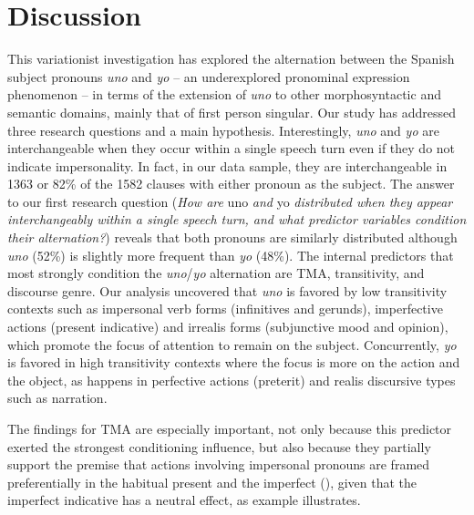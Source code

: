 \documentclass[output=paper]{langscibook}
\begin{document}
\section{Discussion}\label{sec:orozco:5}


This variationist investigation has explored the alternation between the Spanish subject pronouns \textit{uno} and \textit{yo} – an underexplored pronominal expression phenomenon – in terms of the extension of \textit{uno} to other morphosyntactic and semantic domains, mainly that of first person singular. Our study has addressed three research questions and a main hypothesis. Interestingly, \textit{uno} and \textit{yo} are interchangeable when they occur within a single speech turn even if they do not indicate impersonality. In fact, in our data sample, they are interchangeable in 1363 or 82\% of the 1582 clauses with either pronoun as the subject. The answer to our first research question (\textit{How are} uno \textit{and} yo \textit{distributed when they appear interchangeably within a single speech turn, and what predictor variables condition their alternation?}) reveals that both pronouns are similarly distributed although \textit{uno} (52\%) is slightly more frequent than \textit{yo} (48\%). The internal predictors that most strongly condition the \textit{uno}/\textit{yo} alternation are TMA, transitivity, and discourse genre. Our analysis uncovered that \textit{uno} is favored by low transitivity contexts such as impersonal verb forms (infinitives and gerunds), imperfective actions (present indicative) and irrealis forms (subjunctive mood and opinion), which promote the focus of attention to remain on the subject. Concurrently, \textit{yo} is favored in high transitivity contexts where the focus is more on the action and the object, as happens in perfective actions (preterit) and realis discursive types such as narration. 



The findings for TMA are especially important, not only because this predictor exerted the strongest conditioning influence, but also because they partially support the premise that actions involving impersonal pronouns are framed preferentially in the habitual present and the imperfect (\citealt{MuñizCachón1998}), given that the imperfect indicative has a neutral effect, as example  illustrates.  
\end{document}
